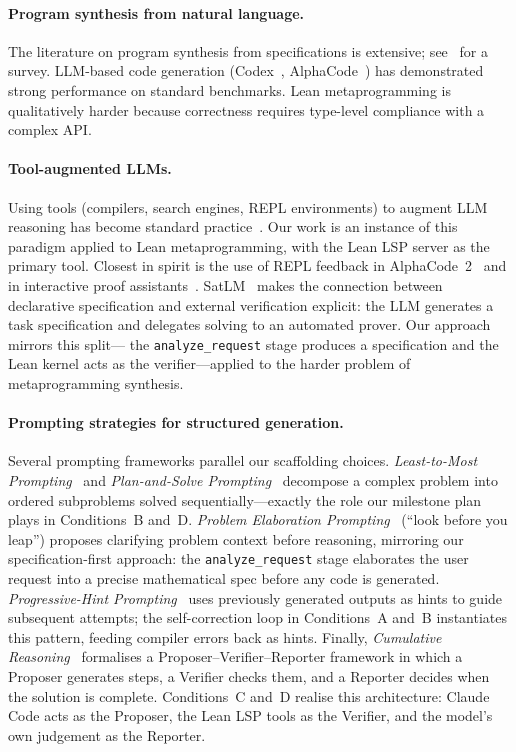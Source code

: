 \documentclass{llncs}
\begin{document}
\paragraph{Program synthesis from natural language.}
The literature on program synthesis from specifications is extensive;
see~\cite{gulwani2017program} for a survey.  LLM-based code generation
(Codex~\cite{chen2021codex}, AlphaCode~\cite{li2022competition}) has
demonstrated strong performance on standard benchmarks.
Lean metaprogramming is qualitatively harder because correctness requires
type-level compliance with a complex API.

\paragraph{Tool-augmented LLMs.}
Using tools (compilers, search engines, REPL environments) to augment LLM
reasoning has become standard practice~\cite{schick2023toolformer}.
Our work is an instance of this paradigm applied to Lean metaprogramming,
with the Lean LSP server as the primary tool.
Closest in spirit is the use of REPL feedback in
AlphaCode~2~\cite{alphacode2} and in interactive proof
assistants~\cite{first2023baldur}.
SatLM~\cite{ye2023satlm} makes the connection between declarative specification
and external verification explicit: the LLM generates a task specification and
delegates solving to an automated prover.  Our approach mirrors this split---
the \texttt{analyze\_request} stage produces a specification and the Lean kernel
acts as the verifier---applied to the harder problem of metaprogramming synthesis.

\paragraph{Prompting strategies for structured generation.}
Several prompting frameworks parallel our scaffolding choices.
\emph{Least-to-Most Prompting}~\cite{zhou2022least} and
\emph{Plan-and-Solve Prompting}~\cite{wang2023planandsolve} decompose a complex
problem into ordered subproblems solved sequentially---exactly the role our milestone
plan plays in Conditions~B and~D.
\emph{Problem Elaboration Prompting}~\cite{liao2024leap} (``look before you leap'')
proposes clarifying problem context before reasoning, mirroring our
specification-first approach: the \texttt{analyze\_request} stage elaborates the
user request into a precise mathematical spec before any code is generated.
\emph{Progressive-Hint Prompting}~\cite{zheng2023php} uses previously generated
outputs as hints to guide subsequent attempts; the self-correction loop in
Conditions~A and~B instantiates this pattern, feeding compiler errors back as
hints.
Finally, \emph{Cumulative Reasoning}~\cite{zhang2023cumulative} formalises a
Proposer--Verifier--Reporter framework in which a Proposer generates steps, a
Verifier checks them, and a Reporter decides when the solution is complete.
Conditions~C and~D realise this architecture: Claude Code acts as the Proposer,
the Lean LSP tools as the Verifier, and the model's own judgement as the Reporter.
\end{document}
